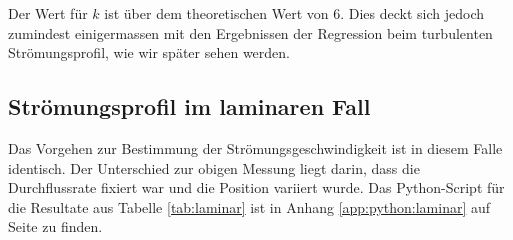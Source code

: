 Der   Wert    f\"ur   $k$    ist   \"uber    dem   theoretischen    Wert   von
\num{6}\footnotemark[3]. Dies  deckt sich  jedoch zumindest  einigermassen mit
den  Ergebnissen der  Regression beim  turbulenten Str\"omungsprofil,  wie wir
sp\"ater sehen werden.



\clearpage
\subsection{Str\"omungsprofil im laminaren Fall}
\label{subsec:profil:laminar}

Das  Vorgehen  zur Bestimmung  der  Str\"omungsgeschwindigkeit  ist in  diesem
Falle  identisch. Der  Unterschied  zur   obigen  Messung  liegt  darin,  dass
die  Durchflussrate   fixiert  war   und  die  Position   variiert  wurde. Das
Python-Script f\"ur die Resultate aus  Tabelle \ref{tab:laminar} ist in Anhang
\ref{app:python:laminar} auf Seite \pageref{app:python:laminar} zu finden.

